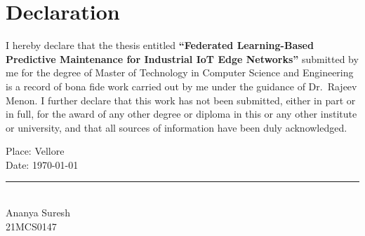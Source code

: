 \chapter*{Declaration}
\thispagestyle{plain}

I hereby declare that the thesis entitled \textbf{``Federated Learning-Based Predictive
Maintenance for Industrial IoT Edge Networks''} submitted by me for the degree of Master
of Technology in Computer Science and Engineering is a record of bona fide work carried
out by me under the guidance of Dr.\ Rajeev Menon. I further declare that this work has
not been submitted, either in part or in full, for the award of any other degree or
diploma in this or any other institute or university, and that all sources of information
have been duly acknowledged.

\vspace{0.5in}
\noindent
\begin{minipage}[t]{0.47\textwidth}
Place: Vellore\\
Date: \today
\end{minipage}\hfill
\begin{minipage}[t]{0.47\textwidth}
\raggedleft
\vspace{0.35in}
\rule{2.3in}{0.4pt}\\
Ananya Suresh\\
21MCS0147
\end{minipage}
\par

